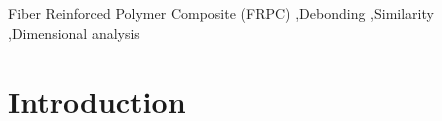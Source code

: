 \documentclass[a4paper,fleqn]{cas-dc}
\begin{document}
\begin{abstract}
This template helps you to create a properly formatted \LaTeX\ manuscript.

\noindent\texttt{\textbackslash begin{abstract}} \dots 
\texttt{\textbackslash end{abstract}} and
\verb+\begin{keyword}+ \verb+...+ \verb+\end{keyword}+ 
which
contain the abstract and keywords respectively. 

\noindent Each keyword shall be separated by a \verb+\sep+ command.
\end{abstract}

%

\begin{keywords}
Fiber Reinforced Polymer Composite (FRPC) \sep Debonding \sep Similarity \sep Dimensional analysis
\end{keywords}


\maketitle

\section{Introduction}
\end{document}
